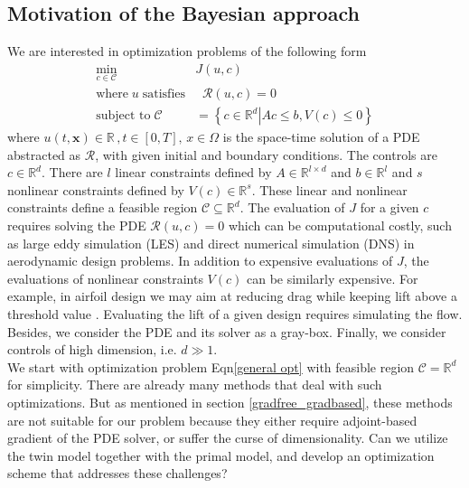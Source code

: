 \documentclass[a4paper,onecolumn]{article}
\theoremstyle{remark}
\begin{document}
\subsection{Motivation of the Bayesian approach}
We are interested in optimization problems of the following form
\begin{equation}\begin{split}
    \min_{c\in\mathcal{C}} & J(u,c)\\
    \textrm{where}\; u\; \textrm{satisfies}& \;\; \mathcal{R}(u,c) = 0\\
    \textrm{subject to} \; \mathcal{C} & = \left\{\left. c\in\mathbb{R}^d\right| 
    A c\le b, V(c)\le 0\right\}
\end{split}\label{general opt}
\end{equation}
where $u(t,\mathbf{x})\in\mathbb{R}\,, t\in[0,T], \,x\in\Omega$
is the space-time solution of a PDE abstracted as
$\mathcal{R}$, with given initial and boundary conditions.
The controls are $c\in\mathbb{R}^d$. 
There are $l$ linear constraints defined by $A\in\mathbb{R}^{l\times d}$ and $b\in\mathbb{R}^{l}$
and $s$ nonlinear constraints defined by $V(c)\in \mathbb{R}^s$. 
These linear and nonlinear constraints define a feasible region 
$\mathcal{C}\subseteq \mathbb{R}^d$. The evaluation of $J$ for a given $c$ requires
solving the PDE $\mathcal{R}(u,c)=0$ which can be computational costly, such
as large eddy simulation (LES) \cite{LES, LES oldest} 
and direct numerical simulation (DNS) \cite{DNS} in  
aerodynamic design problems.
In addition to expensive evaluations of $J$, the evaluations of
nonlinear constraints $V(c)$ can be similarly expensive. For example, 
in airfoil design we may aim at reducing drag while keeping lift 
above a threshold value \cite{constraint lift}. Evaluating the lift of a given design
requires simulating the flow. Besides, we consider the PDE and its solver 
as a gray-box. Finally, we consider controls of high dimension, i.e. $d\gg 1$.\\

\noindent We start with optimization problem Eqn\eqref{general opt} with feasible region
$\mathcal{C}=\mathbb{R}^d$ for simplicity.
There are already many methods that deal with such optimizations. 
But as mentioned in section \ref{gradfree_gradbased}, these methods are not suitable
for our problem because they either require adjoint-based gradient of the PDE solver, 
or suffer the curse of dimensionality. Can we utilize the twin model together
with the primal model, and develop an optimization scheme that addresses these challenges?\\
\end{document}
